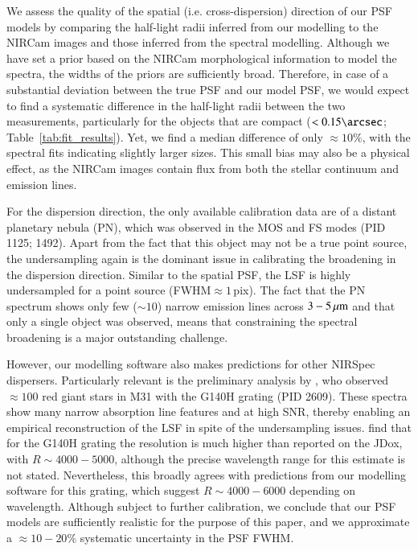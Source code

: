\documentclass[longauth]{aa}
\newcommand{\micron}{\rm \mu m}
\begin{document}
\begin{appendix}
{We assess the quality of the spatial (i.e. cross-dispersion) direction of our PSF models by comparing the half-light radii inferred from our modelling to the NIRCam images and those inferred from the spectral modelling. Although we have set a prior based on the NIRCam morphological information to model the spectra, the widths of the priors are sufficiently broad. Therefore, in case of a substantial deviation between the true PSF and our model PSF, we would expect to find a systematic difference in the half-light radii between the two measurements, particularly for the objects that are compact ($<0.15\arcsec$; Table~\ref{tab:fit_results}). Yet, we find a median difference of only $\approx 10\%$, with the spectral fits indicating slightly larger sizes. This small bias may also be a physical effect, as the NIRCam images contain flux from both the stellar continuum and emission lines.

For the dispersion direction, the only available calibration data are of a distant planetary nebula (PN), which was observed in the MOS and FS modes (PID 1125; 1492). Apart from the fact that this object may not be a true point source, the undersampling again is the dominant issue in calibrating the broadening in the dispersion direction. Similar to the spatial PSF, the LSF is highly undersampled for a point source (FWHM$\approx1\,$pix). The fact that the PN spectrum shows only few ($\sim 10$) narrow emission lines across $3-5\,\micron$ and that only a single object was observed, means that constraining the spectral broadening is a major outstanding challenge. 

However, our modelling software also makes predictions for other NIRSpec dispersers. Particularly relevant is the preliminary analysis by \citet{Nidever2023}, who observed $\approx 100$ red giant stars in M31 with the G140H grating (PID 2609). These spectra show many narrow absorption line features and at high SNR, thereby enabling an empirical reconstruction of the LSF in spite of the undersampling issues. \citet{Nidever2023} find that for the G140H grating the resolution is much higher than reported on the JDox, with $R\sim4000-5000$, although the precise wavelength range for this estimate is not stated. Nevertheless, this broadly agrees with predictions from our modelling software for this grating, which suggest $R\sim4000-6000$ depending on wavelength. 
Although subject to further calibration, we conclude that our PSF models are sufficiently realistic for the purpose of this paper, and we approximate a $\approx10-20\%$ systematic uncertainty in the PSF FWHM. } 






\end{appendix}
\end{document}
